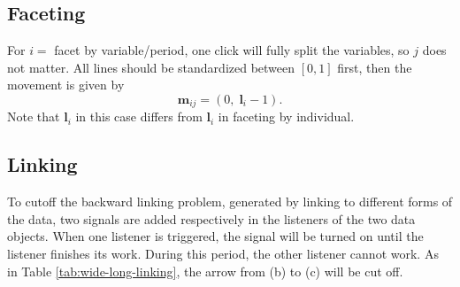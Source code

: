 \documentclass[12pt]{article}
\begin{document}

\subsection{Faceting}\label{sub:appendix-faceting}

For $i=$ facet by variable/period, one click will fully split
the variables, so $j$ does not matter. All lines should be
standardized between $[0,1]$ first, then the movement is given by
\[
\mathbf{m}{}_{ij} = (0,\; \mathbf{l}{}_i-1).
\]
Note that $\mathbf{l}{}_i$ in this case differs from
$\mathbf{l}{}_i$ in faceting by individual.

\subsection{Linking}

To cutoff the backward linking problem, generated by linking to different forms of the data, two signals are added respectively
in the listeners of the two data objects. When one listener
is triggered, the signal will be turned on until the listener
finishes its work. During this period, the other listener cannot work.
As in Table \ref{tab:wide-long-linking}, the arrow from  (b) to  (c)
will be cut off.
\end{document}
